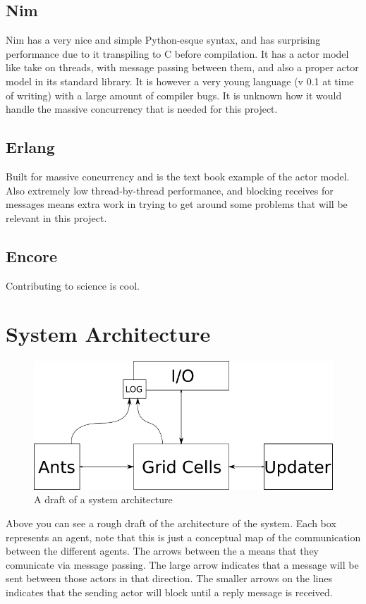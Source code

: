 \documentclass[a4paper]{article}
\begin{document}
\subsection{Nim}
Nim has a very nice and simple Python-esque syntax, and has surprising performance due to it
transpiling to C before compilation. It has a actor model like take on threads, with message
passing between them, and also a proper actor model in its standard library. It is however a
very young language (v 0.1 at time of writing) with a large amount of compiler bugs. It is
unknown how it would handle the massive concurrency that is needed for this project. 

\subsection{Erlang}
Built for massive concurrency and is the text book example of the actor model. Also extremely
low thread-by-thread performance, and blocking receives for messages means extra work in
trying to get around some problems that will be relevant in this project. 

\subsection{Encore}
Contributing to science is cool. 

\section{System Architecture}

\begin{figure}[h!]
\centerline{
\includegraphics[scale=0.6]{images/architecture.png} 
}
\caption{A draft of a system architecture} 
\label{fig:arch}
\end{figure}
Above you can see a rough draft of the architecture of the system. Each box
represents an agent, note that this is just a conceptual map of the
communication between the different agents. The arrows between the a means that
they comunicate via message passing.
The large arrow indicates that a message will be sent between those actors in that
direction. The smaller arrows on the lines indicates that the sending actor
will block until a reply message is received.
\end{document}
